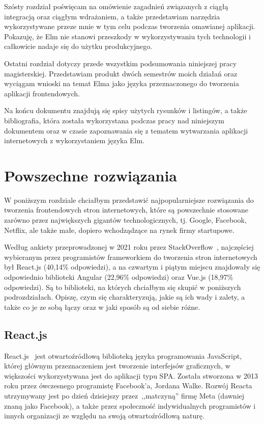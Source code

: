 \documentclass[twoside,a4paper]{report}
\begin{document}
Szósty rozdział poświęcam na omówienie zagadnień związanych z ciągłą integracją oraz ciągłym wdrażaniem, a także przedstawiam narzędzia wykorzystywane przeze mnie w tym celu podczas tworzenia omawianej aplikacji.
Pokazuję, że Elm nie stanowi przeszkody w wykorzystywaniu tych technologii i całkowicie nadaje się do użytku produkcyjnego.

Ostatni rozdział dotyczy przede wszystkim podsumowania niniejszej pracy magisterskiej.
Przedstawiam produkt dwóch semestrów moich działań oraz wyciągam wnioski na temat Elma jako języka przeznaczonego do tworzenia aplikacji frontendowych.

Na końcu dokumentu znajdują się spisy użytych rysunków i listingów, a także bibliografia, która została wykorzystana podczas pracy nad niniejszym dokumentem oraz w czasie zapoznawania się z tematem wytwarzania aplikacji internetowych z wykorzystaniem języka Elm.


\chapter{Powszechne rozwiązania}
W poniższym rozdziale chciałbym przedstawić najpopularniejsze rozwiązania do tworzenia frontendowych stron internetowych, które są powszechnie stosowane zarówno przez największych gigantów technologicznych, tj. Google, Facebook, Netflix, ale także małe, dopiero wchodządzące na rynek firmy startupowe.

Według ankiety przeprowadzonej w 2021 roku przez StackOverflow~\cite{stacksurvey}, najczęściej wybieranym przez programistów frameworkiem do tworzenia stron internetowych był React.js (40,14\% odpowiedzi), a na czwartym i piątym miejscu znajdowały się odpowiednio biblioteki Angular (22,96\% odpowiedzi) oraz Vue.js (18,97\% odpowiedzi).
Są to biblioteki, na których chciałbym się skupić w poniższych podrozdziałach.
Opiszę, czym się charakteryzują, jakie są ich wady i zalety, a także co je ze sobą łączy oraz w jaki sposób są od siebie różne.

\section{React.js}
React.js~\cite{react} jest otwartoźródłową biblioteką języka programowania JavaScript, której głównym przeznaczeniem jest tworzenie interfejsów graficznych, w większości wykorzystywana jest do aplikacji typu SPA\@.
Została stworzona w 2013 roku przez ówczesnego programistę Facebook'a, Jordana Walke.
Rozwój Reacta utrzymywany jest po dzień dzisiejszy przez~,,matczyną'' firmę Meta (dawniej znaną jako Facebook), a także przez społeczność indywidualnych programistów i innych organizacji ze względu na swoją otwartoźródłową naturę.
\end{document}
